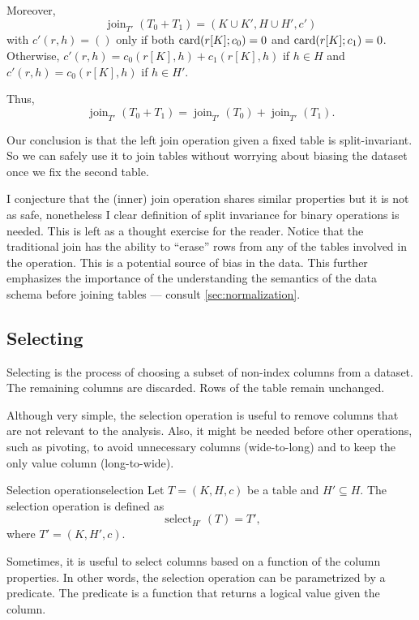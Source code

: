 Moreover, \[
  \operatorname{join}_{T'}(T_0 + T_1) = (K \cup K', H \cup H', c')
\] with $c'(r, h) = ()$ only if both $\rowcard[{r[K]; c_0}] = 0$ and $\rowcard[{r[K];
c_1}] = 0$.  Otherwise, $c'(r, h) = c_0(r[K], h) + c_1(r[K], h)$ if $h \in H$ and $c'(r,
h) = c_0(r[K], h)$ if $h \in H'$.

Thus, \[
  \operatorname{join}_{T'}(T_0 + T_1) = \operatorname{join}_{T'}(T_0) + \operatorname{join}_{T'}(T_1)\text{.}
\]

Our conclusion is that the left join operation given a fixed table is split-invariant.
So we can safely use it to join tables without worrying about biasing the dataset once we
fix the second table.

I conjecture that the (inner) join operation shares similar properties but it is not as
safe, nonetheless I clear definition of split invariance for binary operations is needed.
This is left as a thought exercise for the reader.  Notice that the traditional join has
the ability to ``erase'' rows from any of the tables involved in the operation.  This is a
potential source of bias in the data.  This further emphasizes the importance of the
understanding the semantics of the data schema before joining tables --- consult
\cref{sec:normalization}.

\subsection{Selecting}
\label{sub:selection}

Selecting is the process of choosing a subset of non-index columns from a dataset.  The
remaining columns are discarded.  Rows of the table remain unchanged.

Although very simple, the selection operation is useful to remove columns that are not
relevant to the analysis.  Also, it might be needed before other operations, such as
pivoting, to avoid unnecessary columns (wide-to-long) and to keep the only value column
(long-to-wide).

\begin{defbox}{Selection operation}{selection}
  Let $T = (K, H, c)$ be a table and $H' \subseteq H$.  The selection operation is
  defined as \[
    \operatorname{select}_{H'}(T) = T'\text{,}
  \] where $T' = (K, H', c)$.
\end{defbox}

Sometimes, it is useful to select columns based on a function of the column properties.
In other words, the selection operation can be parametrized by a predicate.  The predicate
is a function that returns a logical value given the column.

